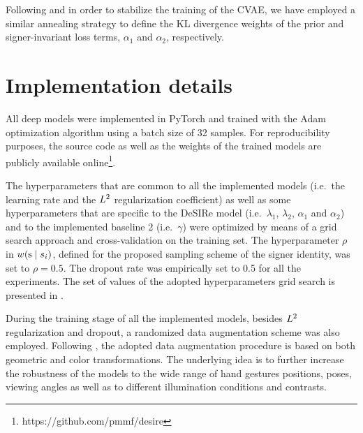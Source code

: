 Following \citet{Bowman2015} and in order to stabilize the training of the CVAE, we have employed a similar annealing strategy to define the KL divergence weights of the prior and signer-invariant loss terms, $\alpha_1$ and $\alpha_2$, respectively.

\section{Implementation details}
\label{sec:desire_imp_details}
All deep models were implemented in PyTorch and trained with the Adam optimization algorithm using a batch size of 32 samples. For reproducibility purposes, the source code as well as the weights of the trained models are publicly available online\footnote{https://github.com/pmmf/desire}.

The hyperparameters that are common to all the implemented models (i.e.\ the learning rate and the $L^2$ regularization coefficient) as well as some hyperparameters that are specific to the DeSIRe model (i.e.\ $\lambda_{1}$, $\lambda_{2}$, $\alpha_{1}$ and $\alpha_{2}$) and to the implemented baseline 2 (i.e.\ $\gamma$) were optimized by means of a grid search approach and cross-validation on the training set. The hyperparameter $\rho$ in $w({\textnormal{s}} \mid s_{i})$, defined for the proposed sampling scheme of the signer identity, was set to $\rho=0.5$. The dropout rate was empirically set to 0.5 for all the experiments. The set of values of the adopted hyperparameters grid search is presented in .

During the training stage of all the implemented models, besides $L^2$ regularization and dropout, a randomized data augmentation scheme was also employed. Following \citet{Ferreira2018}, the adopted data augmentation procedure is based on both geometric and color transformations. The underlying idea is to further increase the robustness of the models to the wide range of hand gestures positions, poses, viewing angles as well as to different illumination conditions and contrasts.

